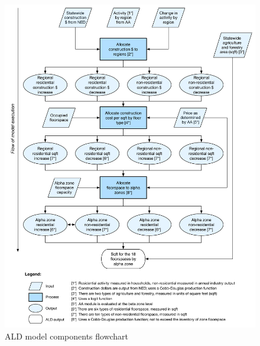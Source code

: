 \begin{figure}
\centering
\includegraphics[width=6.5in]{ald/ald-alt-flowchart}
\caption{ALD model components flowchart}\label{fig:ald-components}
\end{figure}

